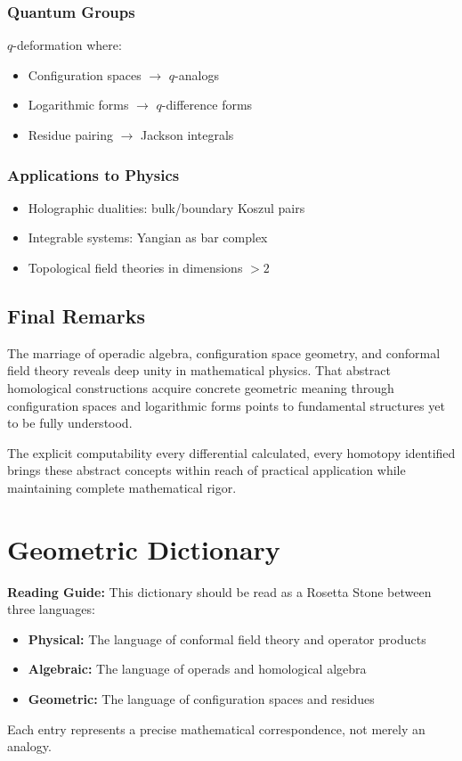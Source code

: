 \subsubsection{Quantum Groups}
$q$-deformation where:
\begin{itemize}
\item Configuration spaces $\to$ $q$-analogs
\item Logarithmic forms $\to$ $q$-difference forms
\item Residue pairing $\to$ Jackson integrals
\end{itemize}
 
\subsubsection{Applications to Physics}
\begin{itemize}
\item Holographic dualities: bulk/boundary Koszul pairs
\item Integrable systems: Yangian as bar complex
\item Topological field theories in dimensions $> 2$
\end{itemize}
 

\subsection{Final Remarks}
 
The marriage of operadic algebra, configuration space geometry, and conformal field theory reveals deep unity in mathematical physics. That abstract homological constructions acquire concrete geometric meaning through configuration spaces and logarithmic forms points to fundamental structures yet to be fully understood.
 
The explicit computability every differential calculated, every homotopy identified brings these abstract concepts within reach of practical application while maintaining complete mathematical rigor.
 
\appendix
\section{Geometric Dictionary}

\textbf{Reading Guide:} This dictionary should be read as a Rosetta Stone between three languages:
\begin{itemize}
\item \textbf{Physical:} The language of conformal field theory and operator products
\item \textbf{Algebraic:} The language of operads and homological algebra  
\item \textbf{Geometric:} The language of configuration spaces and residues
\end{itemize}
Each entry represents a precise mathematical correspondence, not merely an analogy.


